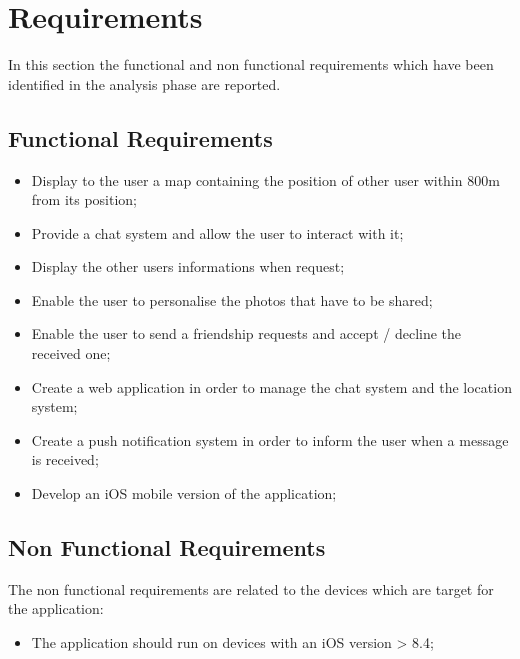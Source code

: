 \section{Requirements}
In this section the functional and non functional requirements which have been identified in the analysis phase are reported.
\subsection{Functional Requirements}
\begin{itemize}
\item Display to the user a map containing the position of other user within 800m from its position;
\item Provide a chat system and allow the user to interact with it;
\item Display the other users informations when request;
\item Enable the user to personalise the photos that have to be shared;
\item Enable the user to send a friendship requests and accept / decline the received one;
\item Create a web application in order to manage the chat system and the location system;
\item Create a push notification system in order to inform the user when a message is received;
\item Develop an iOS mobile version of the application;
\end{itemize} 


\subsection{Non Functional Requirements}
The non functional requirements are related to the devices which are target for the application:
\begin{itemize}
\item The application should run on devices with an iOS version > 8.4;
\end{itemize}